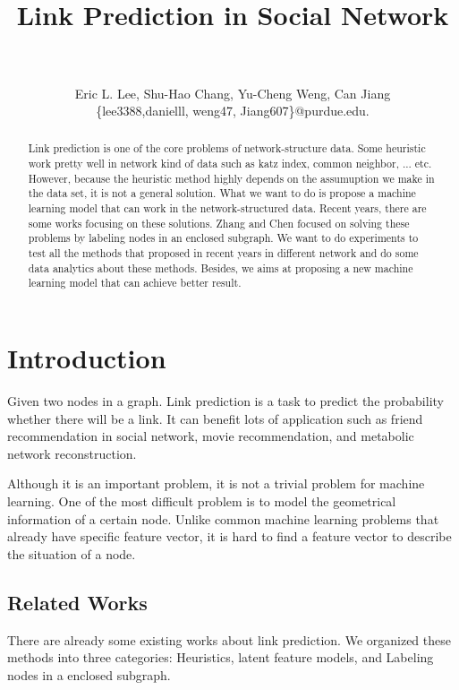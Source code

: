 \documentclass[paper=letter, fontsize=12pt]{scrartcl} %
\title{	
\normalfont \normalsize 
\horrule{2pt} \\[0.4cm] %
{\LARGE Link Prediction in Social Network} \\ %
\horrule{1pt} \\[0.5cm] %
}
\author{\large{Eric L. Lee, Shu-Hao Chang, Yu-Cheng Weng, Can Jiang}\\
  \normalsize{\{lee3388,danielll, weng47, Jiang607\}@purdue.edu.}
} %
\date{} %
\begin{document}
\maketitle %

\begin{abstract}
  Link prediction is one of the core problems of network-structure data. Some heuristic work pretty well in network kind of data such as katz index\cite{katz}, common neighbor, ... etc. However, because the heuristic method highly depends on the assumuption we make in the data set, it is not a general solution. What we want to do is propose a machine learning model that can work in the network-structured data. Recent years, there are some works focusing on these solutions. Zhang and Chen \cite{lpnn} \cite{wlnn} focused on solving these problems by labeling nodes in an enclosed subgraph. We want to do experiments to test all the methods that proposed in recent years in different network and do some data analytics about these methods. Besides, we aims at proposing a new machine learning model that can achieve better result.
\end{abstract}

\section{Introduction}
Given two nodes in a graph. Link prediction is a task to predict the probability whether there will be a link. It can benefit lots of application such as friend recommendation in social network, movie recommendation, and metabolic network reconstruction.

Although it is an important problem, it is not a trivial problem for machine learning. One of the most difficult problem is to model the geometrical information of a certain node. Unlike common machine learning problems that already have specific feature vector, it is hard to find a feature vector to describe the situation of a node.

\subsection {Related Works}
There are already some existing works about link prediction. We organized these methods into three categories: Heuristics, latent feature models, and  Labeling nodes in a enclosed subgraph.
\end{document}
